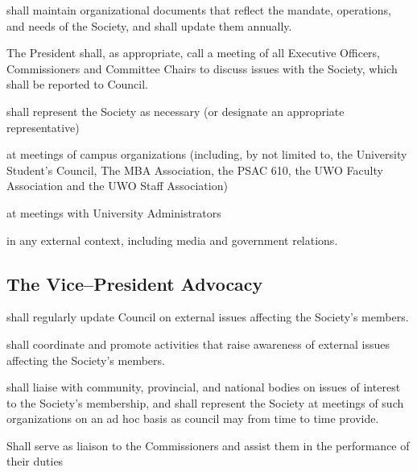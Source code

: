 \begin{longenum}[ label*=\thesubsection.\arabic*., align=left]
    \item shall maintain organizational documents that reflect the mandate, operations, and needs of the Society, and shall update them annually. 
    \item The President shall, as appropriate, call a meeting of all Executive Officers, Commissioners and Committee Chairs to discuss issues with the Society, which shall be reported to Council.
        \item shall represent the Society as necessary (or designate an appropriate representative)
        \begin{longenum}[ label*=\arabic*., align=left]
        \item at meetings of campus organizations (including, by not limited to, the University Student's Council, The MBA Association, the PSAC 610, the UWO Faculty Association and the UWO Staff Association)
        \item at meetings with University Administrators
        \item in any external context, including media and government relations.
        \end{longenum}        
            
\end{longenum}

\subsection {The Vice--President Advocacy}
\begin{longenum}[ label*=\thesubsection.\arabic*., align=left]
	\item shall regularly update Council on external issues affecting the Society's members.
    \item shall coordinate and promote activities that raise awareness of external issues affecting the Society's members.
    \item shall liaise with community, provincial, and national bodies on issues of interest to the Society's membership, and shall represent the Society at meetings of such organizations on an ad hoc basis as council may from time to time provide.
\item Shall serve as liaison to the Commissioners and assist them in the performance of their duties  

\end{longenum}


